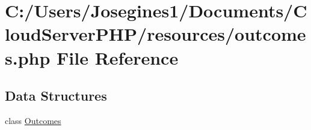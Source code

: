 \hypertarget{outcomes_8php}{}\section{C\+:/\+Users/\+Josegines1/\+Documents/\+Cloud\+Server\+P\+H\+P/resources/outcomes.php File Reference}
\label{outcomes_8php}
\subsection*{Data Structures}
\begin{DoxyCompactItemize}
\item 
class \mbox{\hyperlink{class_outcomes}{Outcomes}}
\end{DoxyCompactItemize}
